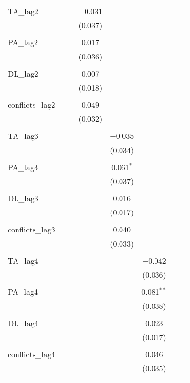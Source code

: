 \begin{table}[!htbp]
\begin{tabular}{@{\extracolsep{5pt}}lccccccc}
 TA\_lag2 &  &  & $-$0.031 &  &  &  &  \\ 
  &  &  & (0.037) &  &  &  &  \\ 
  & & & & & & & \\ 
 PA\_lag2 &  &  & 0.017 &  &  &  &  \\ 
  &  &  & (0.036) &  &  &  &  \\ 
  & & & & & & & \\ 
 DL\_lag2 &  &  & 0.007 &  &  &  &  \\ 
  &  &  & (0.018) &  &  &  &  \\ 
  & & & & & & & \\ 
 conflicts\_lag2 &  &  & 0.049 &  &  &  &  \\ 
  &  &  & (0.032) &  &  &  &  \\ 
  & & & & & & & \\ 
 TA\_lag3 &  &  &  & $-$0.035 &  &  &  \\ 
  &  &  &  & (0.034) &  &  &  \\ 
  & & & & & & & \\ 
 PA\_lag3 &  &  &  & 0.061$^{*}$ &  &  &  \\ 
  &  &  &  & (0.037) &  &  &  \\ 
  & & & & & & & \\ 
 DL\_lag3 &  &  &  & 0.016 &  &  &  \\ 
  &  &  &  & (0.017) &  &  &  \\ 
  & & & & & & & \\ 
 conflicts\_lag3 &  &  &  & 0.040 &  &  &  \\ 
  &  &  &  & (0.033) &  &  &  \\ 
  & & & & & & & \\ 
 TA\_lag4 &  &  &  &  & $-$0.042 &  &  \\ 
  &  &  &  &  & (0.036) &  &  \\ 
  & & & & & & & \\ 
 PA\_lag4 &  &  &  &  & 0.081$^{**}$ &  &  \\ 
  &  &  &  &  & (0.038) &  &  \\ 
  & & & & & & & \\ 
 DL\_lag4 &  &  &  &  & 0.023 &  &  \\ 
  &  &  &  &  & (0.017) &  &  \\ 
  & & & & & & & \\ 
 conflicts\_lag4 &  &  &  &  & 0.046 &  &  \\ 
  &  &  &  &  & (0.035) &  &  \\ 
  & & & & & & & \\ 

\end{tabular}
\end{table}
